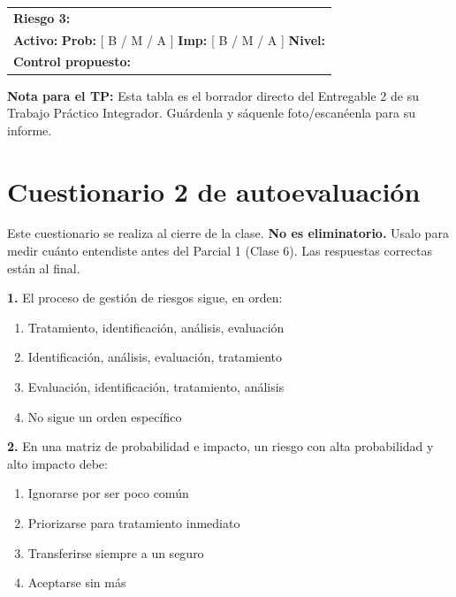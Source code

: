 \documentclass[12pt,a4paper]{article}
\begin{document}
\vspace{8pt}
\begin{tabularx}{\textwidth}{|X|}
\hline
\textbf{Riesgo 3:} \hrulefill \\
\textbf{Activo:} \hrulefill \quad \textbf{Prob:} [ B / M / A ] \quad \textbf{Imp:} [ B / M / A ] \quad \textbf{Nivel:} \hrulefill \\
\textbf{Control propuesto:} \hrulefill \\
\hline
\end{tabularx}

\vspace{12pt}
\begin{cajaNota}
\textbf{Nota para el TP:} Esta tabla es el borrador directo del Entregable 2 de su Trabajo Pr\'actico Integrador. Gu\'ardenla y s\'aquenle foto/escan\'eenla para su informe.
\end{cajaNota}

\newpage
\section{Cuestionario 2 de autoevaluaci\'on}

\begin{cajaNota}[title={Instrucciones}]
Este cuestionario se realiza al cierre de la clase. \textbf{No es eliminatorio.} Usalo para medir cu\'anto entendiste antes del Parcial 1 (Clase 6). Las respuestas correctas est\'an al final.
\end{cajaNota}

\vspace{6pt}

\textbf{1.} El proceso de gesti\'on de riesgos sigue, en orden:
\begin{enumerate}[label=\alph*), leftmargin=2.5em]
  \item Tratamiento, identificaci\'on, an\'alisis, evaluaci\'on
  \item Identificaci\'on, an\'alisis, evaluaci\'on, tratamiento
  \item Evaluaci\'on, identificaci\'on, tratamiento, an\'alisis
  \item No sigue un orden espec\'ifico
\end{enumerate}

\textbf{2.} En una matriz de probabilidad e impacto, un riesgo con alta probabilidad y alto impacto debe:
\begin{enumerate}[label=\alph*), leftmargin=2.5em]
  \item Ignorarse por ser poco com\'un
  \item Priorizarse para tratamiento inmediato
  \item Transferirse siempre a un seguro
  \item Aceptarse sin m\'as
\end{enumerate}
\end{document}
